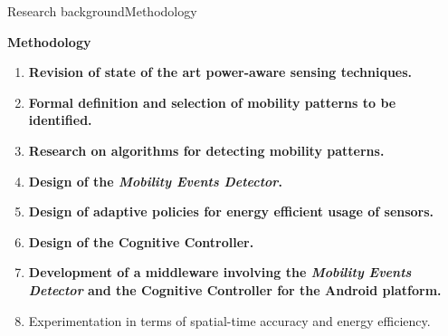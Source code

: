 \begin{frame}{Research background}{Methodology}
\small
\begin{block}{\small \textbf{Methodology}}
\begin{enumerate}
  \item \textbf{Revision of state of the art power-aware sensing techniques.}
  \item \textbf{Formal definition and selection of mobility patterns to be identified.}
  \item \textbf{Research on algorithms for detecting mobility patterns.}
  \item \textbf{Design of the \emph{Mobility Events Detector}.}
  \item \textbf{Design of adaptive policies for energy efficient usage of sensors.}
  \item \textbf{Design of the Cognitive Controller.}
  \item \textbf{Development of a middleware involving the \emph{Mobility Events Detector} and the Cognitive Controller for the Android platform.}
  \item Experimentation in terms of spatial-time accuracy and energy efficiency.
\end{enumerate}
\end{block}
\end{frame}
